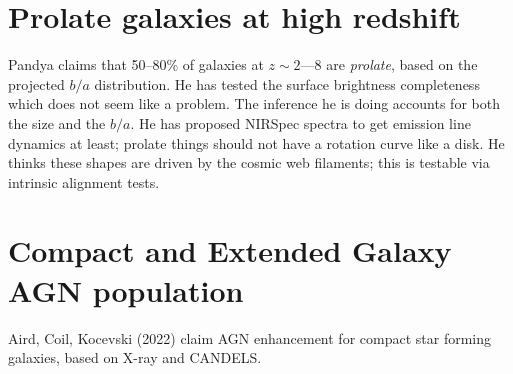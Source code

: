 \documentclass[11pt, preprint]{aastex}
\begin{document}
\section{Prolate galaxies at high redshift}

Pandya claims that 50--80\% of galaxies at $z\sim2$---8 are {\it
  prolate}, based on the projected $b/a$ distribution. He has tested
the surface brightness completeness which does not seem like a
problem. The inference he is doing accounts for both the size and the
$b/a$. He has proposed NIRSpec spectra to get emission line dynamics
at least; prolate things should not have a rotation curve like a
disk. He thinks these shapes are driven by the cosmic web filaments;
this is testable via intrinsic alignment tests.

\section{Compact and Extended Galaxy AGN population}

Aird, Coil, Kocevski (2022) claim AGN enhancement for compact star
forming galaxies, based on X-ray and CANDELS.
\end{document}
